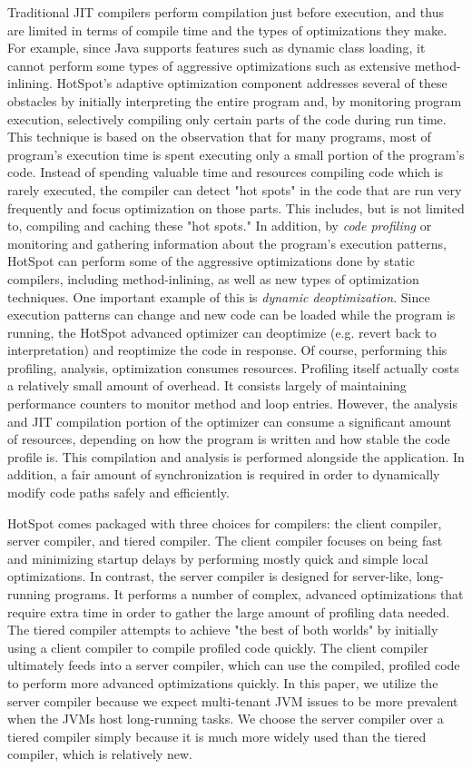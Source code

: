 \documentclass{sig-alternate}
\begin{document}
Traditional JIT compilers perform compilation just before execution, and thus are limited in terms of compile time and the types of optimizations they make. For example, since Java supports features such as dynamic class loading, it cannot perform some types of aggressive optimizations such as extensive method-inlining. HotSpot's adaptive optimization component  addresses several of these obstacles by initially interpreting the entire program and, by monitoring program execution, selectively compiling only certain parts of the code during run time. This technique is based on the observation that for many programs, most of program's execution time is spent executing only a small portion of the program's code. Instead of spending valuable time and resources compiling code which is rarely executed, the compiler can detect "hot spots" in the code that are run very frequently and focus optimization on those parts. This includes, but is not limited to, compiling and caching these "hot spots." In addition, by \textit{code profiling} or monitoring and gathering information about the program's execution patterns, HotSpot can perform some of the aggressive optimizations done by static compilers, including method-inlining, as well as new types of optimization techniques. One important example of this is \textit{dynamic deoptimization}. Since execution patterns can change and new code can be loaded while the program is running, the HotSpot advanced optimizer can deoptimize (e.g. revert back to interpretation) and reoptimize the code in response.
Of course, performing this profiling, analysis, optimization consumes resources. Profiling itself actually costs a relatively small amount of overhead. It consists largely of maintaining performance counters to monitor method and loop entries. However, the analysis and JIT compilation portion of the optimizer can consume a significant amount of resources, depending on how the program is written and how stable the code profile is. This compilation and analysis is performed alongside the application. In addition, a fair amount of synchronization is required in order to dynamically modify code paths safely and efficiently.

HotSpot comes packaged with three choices for compilers: the client compiler, server compiler, and tiered compiler. The client compiler focuses on being fast and minimizing startup delays by performing mostly quick and simple local optimizations. In contrast, the server compiler is designed for server-like, long-running programs. It performs a number of complex, advanced optimizations that require extra time in order to gather the large amount of profiling data needed. The tiered compiler attempts to achieve "the best of both worlds" by initially using a client compiler to compile profiled code quickly. The client compiler ultimately feeds into a server compiler, which can use the compiled, profiled code to perform more advanced optimizations quickly. In this paper, we utilize the server compiler because we expect multi-tenant JVM issues to be more prevalent when the JVMs host long-running tasks. We choose the server compiler over a tiered compiler simply because it is much more widely used than the tiered compiler, which is relatively new.
\end{document}

